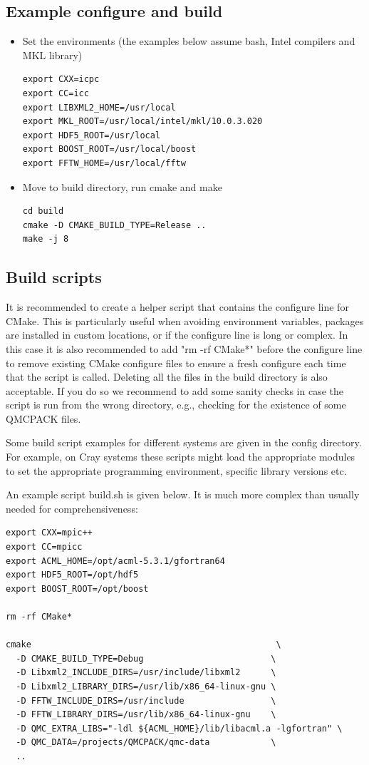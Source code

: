 \subsection{Example configure and build}
\begin{itemize}
\item Set the environments (the examples below assume bash, Intel compilers and MKL library)
\verbatimfont{\footnotesize}
\begin{verbatim}
export CXX=icpc
export CC=icc
export LIBXML2_HOME=/usr/local
export MKL_ROOT=/usr/local/intel/mkl/10.0.3.020
export HDF5_ROOT=/usr/local
export BOOST_ROOT=/usr/local/boost
export FFTW_HOME=/usr/local/fftw
\end{verbatim}

\item Move to build directory, run cmake and make
\verbatimfont{\footnotesize}
\begin{verbatim}
cd build
cmake -D CMAKE_BUILD_TYPE=Release ..
make -j 8
\end{verbatim}
\end{itemize}

\subsection{Build scripts}
It is recommended to create a helper script that contains the
configure line for CMake.  This is particularly useful when avoiding
environment variables, packages are installed in custom locations,
or if the configure line is long or complex.  In this case it is also
recommended to add "rm -rf CMake*" before the configure line to remove
existing CMake configure files to ensure a fresh configure each time
that the script is called. Deleting all the files in the build
directory is also acceptable. If you do so we recommend to add some sanity
checks in case the script is run from the wrong directory, e.g.,
checking for the existence of some QMCPACK files.

Some build script examples for different systems are given in the
config directory. For example, on Cray systems these scripts might
load the appropriate modules to set the appropriate programming
environment, specific library versions etc.

An example script build.sh is given below. It is much more complex
than usually needed for comprehensiveness:

\verbatimfont{\footnotesize}
\begin{verbatim}
export CXX=mpic++
export CC=mpicc
export ACML_HOME=/opt/acml-5.3.1/gfortran64
export HDF5_ROOT=/opt/hdf5
export BOOST_ROOT=/opt/boost

rm -rf CMake*

cmake                                                \
  -D CMAKE_BUILD_TYPE=Debug                         \
  -D Libxml2_INCLUDE_DIRS=/usr/include/libxml2      \
  -D Libxml2_LIBRARY_DIRS=/usr/lib/x86_64-linux-gnu \
  -D FFTW_INCLUDE_DIRS=/usr/include                 \
  -D FFTW_LIBRARY_DIRS=/usr/lib/x86_64-linux-gnu    \
  -D QMC_EXTRA_LIBS="-ldl ${ACML_HOME}/lib/libacml.a -lgfortran" \
  -D QMC_DATA=/projects/QMCPACK/qmc-data            \
  ..
\end{verbatim}

